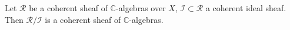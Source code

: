 Let $\mathcal{R}$ be a coherent sheaf of $\mathbb{C}$-algebras over $X$, $\mathcal{I} \subset \mathcal{R}$ a coherent ideal sheaf. Then $\mathcal{R}/\mathcal{I}$ is a coherent sheaf of $\mathbb{C}$-algebras.
